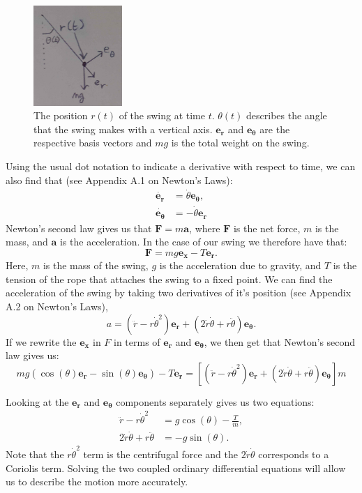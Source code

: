 \documentclass[12pt]{article}
\begin{document}
\begin{figure}[ht]
    \centering
    \includegraphics[width=0.3\textwidth]{Figures/Swing.png}
    \caption{The position $r(t)$ of the swing at time $t$. $\theta(t)$ describes the angle that the swing makes with a vertical axis. $\mathbf{e_r}$ and $\mathbf{e_\theta}$ are the respective basis vectors and $mg$ is the total weight on the swing. \label{figBasis}} %
\end{figure}
Using the usual dot notation to indicate a derivative with respect to time, we can also find that (see Appendix A.1 on Newton's Laws):
\begin{align}
    \dot{\mathbf{e_r}} &=  \dot{\theta}\mathbf{e_\theta},\\
    \dot{\mathbf{e_\theta}} &= -\dot{\theta} \mathbf{e_r}
\end{align}
Newton's second law gives us that $\mathbf{F} = m\mathbf{a}$, where $\mathbf{F}$ is the net force, $m$ is the mass, and $\mathbf{a}$ is the acceleration. In the case of our swing we therefore have that:
$$\mathbf{F} = mg \mathbf{e_x} - T \mathbf{e_r}.$$
Here, $m$ is the mass of the swing, $g$ is the acceleration due to gravity, and $T$ is the tension of the rope that attaches the swing to a fixed point. We can find the acceleration of the swing by taking two derivatives of it's position (see Appendix A.2 on Newton's Laws),
$$
    a = (\ddot{r} - r \dot{\theta}^2) \mathbf{e_r} + (2\dot{r} \dot{\theta} + r \ddot{\theta}) \mathbf{e_\theta}.
$$
If we rewrite the $\mathbf{e_x}$ in $F$ in terms of $\mathbf{e_r}$ and $\mathbf{e_\theta}$, we then get that Newton's second law gives us:
$$mg(\cos(\theta) \mathbf{e_r} - \sin(\theta) \mathbf{e_\theta}) - T\mathbf{e_r} = [(\ddot{r} - r \dot{\theta}^2) \mathbf{e_r} + (2\dot{r} \dot{\theta} + r \ddot{\theta}) \mathbf{e_\theta}]m$$

Looking at the $\mathbf{e_r}$ and $\mathbf{e_\theta}$ components separately gives us two equations:
\begin{align}
    \ddot{r} - r \dot{\theta}^2 &= g\cos(\theta) - \frac{T}{m},\label{ODE1}\\
    2\dot{r} \dot{\theta} + r \ddot{\theta} &= -g\sin(\theta).\label{ODE2}
\end{align}
Note that the $r \dot{\theta}^2$ term is the centrifugal force and the $2 \dot{r}\dot{\theta}$ corresponds to a Coriolis term.  Solving the two coupled ordinary differential equations will allow us to describe the motion more accurately.
\end{document}

